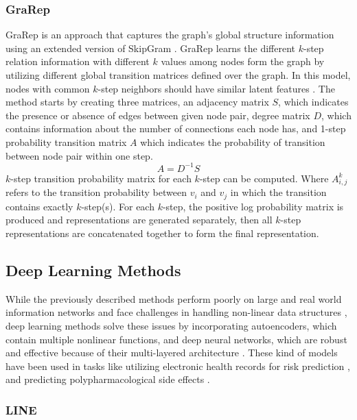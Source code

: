 \subsubsection{GraRep}

\ac{GraRep} is an approach that captures the graph’s global structure information using an extended version of SkipGram \cite{cao_grarep:_2015}.
\ac{GraRep} learns the different $k$-step relation information with different $k$ values among nodes form the graph by utilizing different global transition matrices defined over the graph.
In this model, nodes with common $k$-step neighbors should have similar latent features \cite{cao_grarep:_2015}.
The method starts by creating three matrices, an adjacency matrix $S$, which indicates the presence or absence of edges between given node pair, degree matrix $D$, which contains information about the number of connections each node has, and 1-step probability transition matrix $A$ which indicates the probability of transition between node pair within one step.
\begin{equation} \label{eq:grarep_01}
A = D^{-1}S
\end{equation}
$k$-step transition probability matrix for each $k$-step can be computed.
Where $A^{k}_{i,j}$ refers to the transition probability between $v_{i}$ and $v_{j}$ in which the transition contains exactly $k$-step(s).
For each $k$-step, the positive log probability matrix is produced and representations are generated separately, then all $k$-step representations are concatenated together to form the final representation.

\subsection{Deep Learning Methods}

While the previously described methods perform poorly on large and real world information networks and face challenges in handling non-linear data structures \cite{cui_survey_2017}, deep learning methods solve these issues by incorporating autoencoders, which contain multiple nonlinear functions,  and deep neural networks, which are robust and effective because of their multi-layered architecture \cite{cai_comprehensive_2017}.
These kind of models have been used in tasks like utilizing electronic health records for risk prediction \cite{cheng_risk_2016}, and predicting polypharmacological side effects \cite{zitnik_modeling_2018}.

\subsubsection{LINE}

